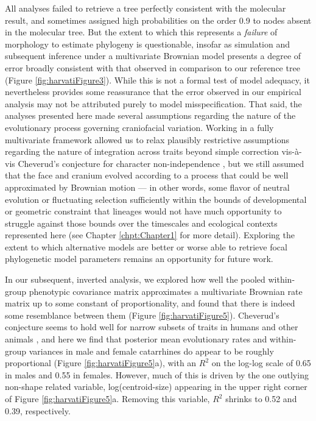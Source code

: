 All analyses failed to retrieve a tree perfectly consistent with the molecular result, and sometimes assigned high probabilities on the order 0.9 to nodes absent in the molecular tree. But the extent to which this represents a \textit{failure} of morphology to estimate phylogeny \citep{collardHowReliableAre2000, gibbsSofttissueCharactersHigher2000} is questionable, insofar as simulation and subsequent inference under a multivariate Brownian model presents a degree of error broadly consistent with that observed in comparison to our reference tree (Figure \ref{fig:harvatiFigure3}). While this is not a formal test of model adequacy, it nevertheless provides some reassurance that the error observed in our empirical analysis may not be attributed purely to model misspecification. That said, the analyses presented here made several assumptions regarding the nature of the evolutionary process governing craniofacial variation. Working in a fully multivariate framework allowed us to relax plausibly restrictive assumptions regarding the nature of integration across traits beyond simple correction vis-à-vis Cheverud's conjecture for character non-independence \citep{alvarez-carreteroBayesianEstimationSpecies2019, varon-gonzalezEstimatingPhylogeniesShape2020}, but we still assumed that the face and cranium evolved according to a process that could be well approximated by Brownian motion --- in other words, some flavor of neutral evolution or fluctuating selection sufficiently within the bounds of developmental or geometric constraint that lineages would not have much opportunity to struggle against those bounds over the timescales and ecological contexts represented here (see Chapter \ref{chpt:Chapter1} for more detail). Exploring the extent to which alternative models are better or worse able to retrieve focal phylogenetic model parameters remains an opportunity for future work.

In our subsequent, inverted analysis, we explored how well the pooled within-group phenotypic covariance matrix approximates a multivariate Brownian rate matrix up to some constant of proportionality, and found that there is indeed some resemblance between them (Figure \ref{fig:harvatiFigure5}). Cheverud's conjecture seems to hold well for narrow subsets of traits in humans \citep{sodiniComparisonGenotypicPhenotypic2018} and other animals \citep{roffEvolutionGeneticCorrelations1996}, and here we find that posterior mean evolutionary rates and within-group variances in male and female catarrhines do appear to be roughly proportional (Figure \ref{fig:harvatiFigure5}a), with an $R^2$ on the log-log scale of 0.65 in males and 0.55 in females. However, much of this is driven by the one outlying non-shape related variable, log(centroid-size) appearing in the upper right corner of Figure \ref{fig:harvatiFigure5}a. Removing this variable, $R^2$ shrinks to 0.52 and 0.39, respectively. 

